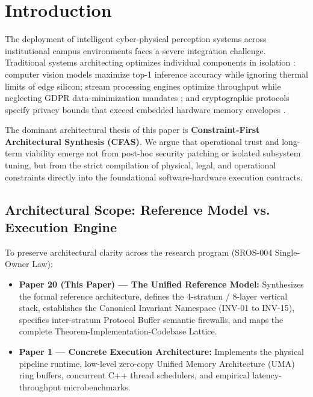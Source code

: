 \documentclass[conference]{IEEEtran}
\begin{document}
\section{Introduction}
The deployment of intelligent cyber-physical perception systems across institutional campus environments faces a severe integration challenge. Traditional systems architecting optimizes individual components in isolation \cite{b_bass}: computer vision models maximize top-1 inference accuracy while ignoring thermal limits of edge silicon; stream processing engines optimize throughput while neglecting GDPR data-minimization mandates \cite{b_satya, b_shi, b_zhou}; and cryptographic protocols specify privacy bounds that exceed embedded hardware memory envelopes \cite{P5}.

The dominant architectural thesis of this paper is \textbf{Constraint-First Architectural Synthesis (CFAS)}. We argue that operational trust and long-term viability emerge not from post-hoc security patching or isolated subsystem tuning, but from the strict compilation of physical, legal, and operational constraints directly into the foundational software-hardware execution contracts.

\subsection{Architectural Scope: Reference Model vs. Execution Engine}
To preserve architectural clarity across the research program (SROS-004 Single-Owner Law):
\begin{itemize}
    \item \textbf{Paper 20 (This Paper) --- The Unified Reference Model:} Synthesizes the formal reference architecture, defines the 4-stratum / 8-layer vertical stack, establishes the Canonical Invariant Namespace (INV-01 to INV-15), specifies inter-stratum Protocol Buffer semantic firewalls, and maps the complete Theorem-Implementation-Codebase Lattice.
    \item \textbf{Paper 1 --- Concrete Execution Architecture:} Implements the physical pipeline runtime, low-level zero-copy Unified Memory Architecture (UMA) ring buffers, concurrent C++ thread schedulers, and empirical latency-throughput microbenchmarks.
\end{itemize}

\end{document}
